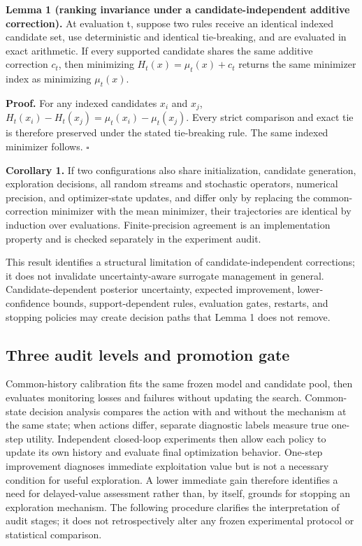 \documentclass[]{interact}
\begin{document}
\textbf{Lemma 1 (ranking invariance under a candidate-independent additive correction).} At evaluation t, suppose two rules receive an identical indexed candidate set, use deterministic and identical tie-breaking, and are evaluated in exact arithmetic. If every supported candidate shares the same additive correction \(c_t\), then minimizing \(H_t(x)=\mu_t(x)+c_t\) returns the same minimizer index as minimizing \(\mu_t(x)\).

\textbf{Proof.} For any indexed candidates \(x_i\) and \(x_j\), \(H_t(x_i)-H_t(x_j)=\mu_t(x_i)-\mu_t(x_j)\). Every strict comparison and exact tie is therefore preserved under the stated tie-breaking rule. The same indexed minimizer follows. $\square$

\textbf{Corollary 1.} If two configurations also share initialization, candidate generation, exploration decisions, all random streams and stochastic operators, numerical precision, and optimizer-state updates, and differ only by replacing the common-correction minimizer with the mean minimizer, their trajectories are identical by induction over evaluations. Finite-precision agreement is an implementation property and is checked separately in the experiment audit.

This result identifies a structural limitation of candidate-independent corrections; it does not invalidate uncertainty-aware surrogate management in general. Candidate-dependent posterior uncertainty, expected improvement, lower-confidence bounds, support-dependent rules, evaluation gates, restarts, and stopping policies may create decision paths that Lemma 1 does not remove.

\hypertarget{three-audit-levels-and-promotion-gate}{%
\subsection{Three audit levels and promotion gate}\label{three-audit-levels-and-promotion-gate}}

Common-history calibration fits the same frozen model and candidate pool, then evaluates monitoring losses and failures without updating the search. Common-state decision analysis compares the action with and without the mechanism at the same state; when actions differ, separate diagnostic labels measure true one-step utility. Independent closed-loop experiments then allow each policy to update its own history and evaluate final optimization behavior. One-step improvement diagnoses immediate exploitation value but is not a necessary condition for useful exploration. A lower immediate gain therefore identifies a need for delayed-value assessment rather than, by itself, grounds for stopping an exploration mechanism. The following procedure clarifies the interpretation of audit stages; it does not retrospectively alter any frozen experimental protocol or statistical comparison.
\end{document}
